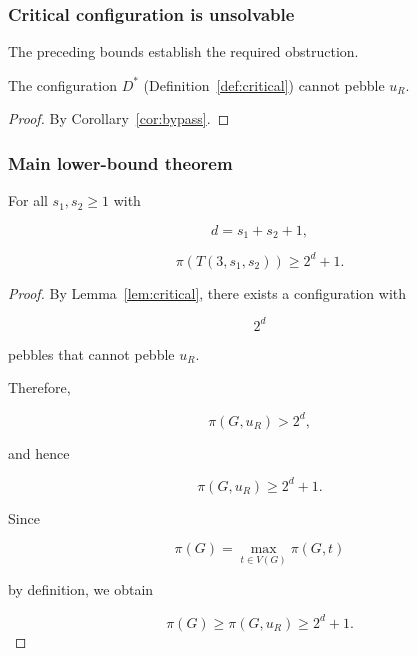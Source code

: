 

\subsubsection{Critical configuration is unsolvable}


The preceding bounds establish the required obstruction.


\begin{lemma}
\label{lem:critical}

The configuration $D^*$ (Definition~\ref{def:critical}) cannot pebble $u_R$.

\end{lemma}



\begin{proof}

By Corollary~\ref{cor:bypass}.

\end{proof}



\subsubsection{Main lower-bound theorem}



\begin{theorem}
\label{thm:lower-bound}

For all $s_1,s_2\ge1$ with

\[
d=s_1+s_2+1,
\]

\[
\pi(T(3,s_1,s_2))\ge2^d+1 .
\]

\end{theorem}



\begin{proof}

By Lemma~\ref{lem:critical}, there exists a configuration with

\[
2^d
\]

pebbles that cannot pebble $u_R$.

Therefore,

\[
\pi(G,u_R)>2^d,
\]

and hence

\[
\pi(G,u_R)\ge2^d+1.
\]

Since

\[
\pi(G)=\max_{t\in V(G)}\pi(G,t)
\]

by definition, we obtain

\[
\pi(G)\ge\pi(G,u_R)\ge2^d+1.
\]

\end{proof}